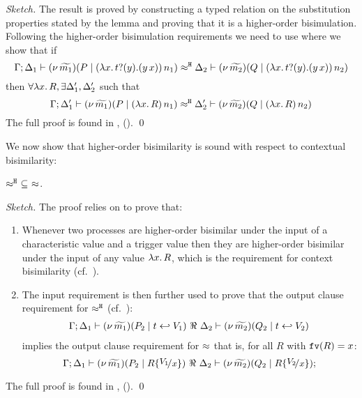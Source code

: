 \begin{proof}[Sketch]
	The result is proved by constructing a typed relation on the
	substitution properties stated by the lemma
	and proving that it is a higher-order bisimulation.
	Following the higher-order bisimulation requirements we
	need to use  where
	we show that if
	\[
		\Gamma; \Delta_1 \vdash (\nu\, \widetilde{m_1})(P \;|\; (\lambda x.\,t ? (y) . (y\, {x}))\, {n_1} ) \approx^\mathtt{H} \Delta_2 \vdash (\nu\, \widetilde{m_2})(Q \;|\; (\lambda x.\,t ? (y) . (y\, {x}))\, {n_2} )
	\]
	then $\forall \lambda x.\,R, \exists \Delta_1', \Delta_2'$ such that
	\[
		\Gamma; \Delta_1' \vdash (\nu\, \widetilde{m_1})(P \;|\; (\lambda x.\,R)\, {n_1} ) \approx^\mathtt{H} \Delta_2' \vdash (\nu\, \widetilde{m_2})(Q \;|\; (\lambda x.\,R)\, {n_2} )
	\]
	The full proof is found in , 
	 ().
	\qed
\end{proof}

We now show that higher-order bisimilarity is sound with respect to contextual bisimilarity:

\begin{lemma}
	\label{lem:wb_is_wbc}
	$\approx^\mathtt{H}\ \subseteq\ \approx$.
\end{lemma}

\begin{proof}[Sketch]
	The proof relies on  to prove that:
	\begin{enumerate}
		\item	Whenever two processes are higher-order bisimilar
				under the input of
				a characteristic value and a trigger value
				then they are higher-order bisimilar under the
				input of any value $\lambda x.\,R$, which is the
				requirement for context bisimilarity (cf.~).

		\item	The input requirement is then further used
				to prove that the 
				output clause requirement for $\approx^\mathtt{H}$ (cf.~):
				\[
					\begin{array}{lrlll}
						\Gamma; \Delta_1  \proves  {\newsp{\widetilde{m_1}}{P_2 \Par \htrigger{t}{V_1}}}
						\ \Re\ 
						\Delta_2 \proves {\newsp{\widetilde{m_2}}{Q_2 \Par \htrigger{t}{V_2}}}
					\end{array}
				\]
				implies the output clause requirement for $\approx$ that is,
				for all $R$ with $\mathtt{fv}(R)=x$:
				\[
					\horel{\Gamma}{\Delta_1}{\newsp{\widetilde{m_1}}{P_2 \Par R\subst{V_1}{x}}}
					{\ \Re\ }
					{\Delta_2}{\newsp{\widetilde{m_2}}{Q_2 \Par R\subst{V_2}{x}}};
				\]
	\end{enumerate}
%
	The full proof is found  in , 
	 ().
	\qed
\end{proof}

